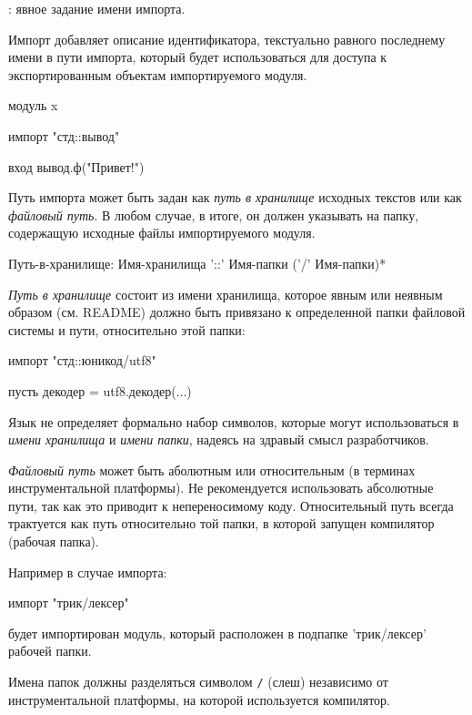 \TBD: явное задание имени импорта.

\bigskip
Импорт добавляет описание идентификатора, текстуально равного последнему имени в пути импорта, который будет использоваться для доступа к экспортированным объектам импортируемого модуля. 

\begin{Trivil}
модуль x

импорт "стд::вывод"

вход {
    вывод.ф("Привет!")
}
\end{Trivil}

Путь импорта может быть задан как \emph{путь в хранилище} исходных текстов или как \emph{файловый путь}. 
В любом случае, в итоге, он должен указывать на папку, содержащую исходные файлы импортируемого модуля.

\begin{Grammar}[vspace=2pt]
Путь-в-хранилище: 
    Имя-хранилища '::' Имя-папки ('/' Имя-папки)*
\end{Grammar} 

\emph{Путь в хранилище} состоит из имени хранилища, которое явным или неявным образом (см. README) должно быть привязано к определенной папки файловой системы и пути, относительно этой папки:
\begin{Trivil}[vspace=2pt]
импорт "стд::юникод/utf8" 

пусть декодер = utf8.декодер(...)
\end{Trivil}

Язык не определяет формально набор символов, которые могут использоваться в  \emph{имени хранилища} и  \emph{имени папки}, надеясь на здравый смысл разработчиков.

\emph{Файловый путь} может быть аболютным или относительным (в терминах инструментальной платформы). 
Не рекомендуется использовать абсолютные пути, так как это приводит к непереносимому коду. 
Относительный путь всегда трактуется как путь относительно той папки, в которой запущен компилятор (рабочая папка). 

Например в случае импорта:
\begin{Trivil}[vspace=2pt]
импорт "трик/лексер"
\end{Trivil}
будет импортирован модуль, который расположен в подпапке 'трик/лексер' рабочей папки.

Имена папок должны разделяться символом \verb+/+ (слеш) независимо от инструментальной платформы, на которой используется компилятор.


